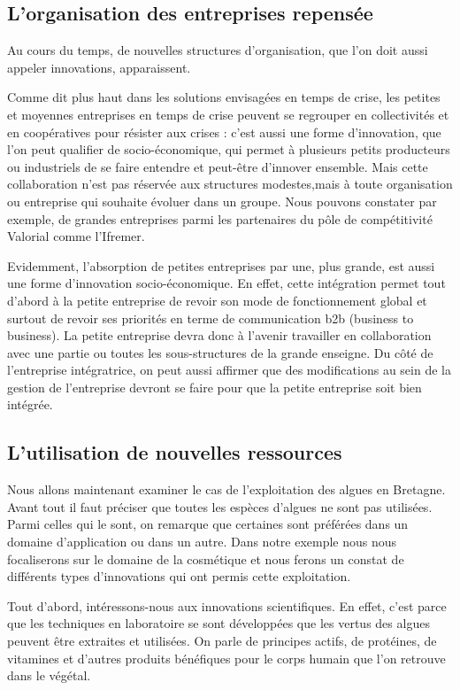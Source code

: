 \documentclass[a4paper,12pt]{report}
\begin{document}
			
		\subsection{L'organisation des entreprises repensée}
			Au cours du temps, de nouvelles structures d’organisation, que l’on doit aussi appeler innovations, apparaissent.
			
			Comme dit plus haut dans les solutions envisagées en temps de crise, les petites et moyennes entreprises en temps de crise peuvent se regrouper en collectivités et en coopératives pour résister aux crises : c’est aussi une forme d’innovation, que l’on peut qualifier de socio-économique, qui permet à plusieurs petits producteurs ou industriels de se faire entendre et peut-être d’innover ensemble. 
			Mais cette collaboration n’est pas réservée aux structures modestes,mais à toute organisation ou entreprise qui souhaite évoluer dans un groupe. Nous pouvons constater par exemple, de grandes entreprises parmi les partenaires du pôle de compétitivité Valorial comme l’Ifremer.
			
			Evidemment, l’absorption de petites entreprises par une, plus grande, est aussi une forme d’innovation socio-économique. En effet, cette intégration permet tout d’abord à la petite entreprise de revoir son mode de fonctionnement global et surtout de revoir ses priorités en terme de communication b2b (business to business). La petite entreprise devra donc à l’avenir travailler en collaboration avec une partie ou toutes les sous-structures de la grande enseigne.
			Du côté de l’entreprise intégratrice, on peut aussi affirmer que des modifications au sein de la gestion de l’entreprise devront se faire pour que la petite entreprise soit bien intégrée. 
			
			
				
		\subsection{L'utilisation de nouvelles ressources}
			Nous allons maintenant examiner le cas de l’exploitation des algues en Bretagne.
			Avant tout il faut préciser que toutes les espèces d’algues ne sont pas utilisées. Parmi celles qui le sont, on remarque que certaines sont préférées dans un domaine d’application ou dans un autre. Dans notre exemple nous nous focaliserons sur le domaine de la cosmétique et nous ferons un constat de différents types d’innovations qui ont permis cette exploitation.
			
			Tout d’abord, intéressons-nous aux innovations scientifiques. En effet, c’est parce que les techniques en laboratoire se sont développées que les vertus des algues peuvent être extraites et utilisées. On parle de principes actifs, de protéines, de vitamines et d’autres produits bénéfiques pour le corps humain que l’on retrouve dans le végétal.
			
\end{document}
